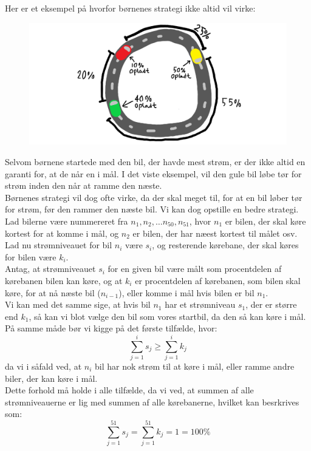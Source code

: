 \documentclass[a4paper,12pt]{article}
\begin{document}
Her er et eksempel på hvorfor børnenes strategi ikke altid vil virke:
\begin{figure}[H]
    \centering
    \includegraphics[width=1.2\textwidth, trim={5.75cm 0 0 0},clip]{figur2.png}
    \caption{}
\end{figure}

Selvom børnene startede med den bil, der havde mest strøm, er der ikke altid en garanti for, at de når en i mål. I det viste eksempel, vil den gule bil løbe tør for strøm inden den når at ramme den næste.\\
Børnenes strategi vil dog ofte virke, da der skal meget til, for at en bil løber tør for strøm, før den rammer den næste bil. Vi kan dog opstille en bedre strategi.\\
Lad bilerne være nummereret fra $n_1, n_2, \dots n_{50}, n_{51}$, hvor $n_1$ er bilen, der skal køre kortest for at komme i mål, og $n_2$ er bilen, der har næest kortest til målet osv.\\
Lad nu strømniveauet for bil $n_i$ være $s_i$, og resterende kørebane, der skal køres for bilen være $k_i$.\\
Antag, at strømniveauet $s_i$ for en given bil være målt som procentdelen af kørebanen bilen kan køre, og at $k_i$ er procentdelen af kørebanen, som bilen skal køre, for at nå næste bil ($n_{i-1}$), eller komme i mål hvis bilen er bil $n_1$.\\
Vi kan med det samme sige, at hvis bil $n_1$ har et strømniveau $s_1$, der er større end $k_1$, så kan vi blot vælge den bil som vores startbil, da den så kan køre i mål.\\
På samme måde bør vi kigge på det første tilfælde, hvor:
\[\sum_{j=1}^{i}s_j \geq \sum_{j=1}^{i}k_j\]
da vi i såfald ved, at $n_i$ bil har nok strøm til at køre i mål, eller ramme andre biler, der kan køre i mål.\\
Dette forhold må holde i alle tilfælde, da vi ved, at summen af alle strømniveauerne er lig med summen af alle kørebanerne, hvilket kan besrkrives som:
\[\sum_{j=1}^{51}s_j = \sum_{j=1}^{51}k_j = 1 = 100\%\]
\end{document}
